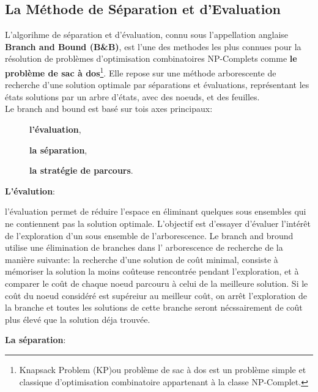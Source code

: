 \documentclass[a4paper,11pt,oneside]{report}
\theoremstyle{plain}
\newcommand{\0}{/ \! \! \! 0}
\theoremstyle{plain}
\begin{document}
\subsection{La M\'ethode de S\'eparation et d'Evaluation}
 L'algorihme de s\'eparation et d'\'evaluation, connu sous l'appellation anglaise {\bf Branch and Bound (B\&B)}, est l'une des methodes les plus
 connues pour la r\'esolution de probl\`emes d'optimisation combinatoires NP-Complets comme {\bf le probl\`eme de sac \`a dos}\footnote{Knapsack Problem 
  (KP)ou probl\`eme de sac \`a dos est un probl\`eme simple et classique d'optimisation combinatoire appartenant \`a la classe NP-Complet.}.
 Elle repose sur une m\'ethode arborescente de recherche d'une solution optimale par s\'eparations et \'evaluations, repr\'esentant les \'etats 
 solutions par un arbre d'\'etats, avec des noeuds, et des feuilles.\\
  Le branch and bound est bas\'e sur tois axes principaux:
  \begin{description}
   \item[] {\bf l'\'evaluation},
   \item[] {\bf la s\'eparation},
   \item[] {\bf la strat\'egie de parcours}.
  \end{description}
  {\bf L'\'evalution}:
  \begin{description}
  \item l'\'evaluation permet de r\'eduire l'espace en \'eliminant quelques sous ensembles qui ne contiennent pas la solution optimale. L'objectif est d'essayer
   d'\'evaluer l'int\'er\^et de l'exploration d'un sous ensemble de l'arborescence. Le branch and bround utilise une \'elimination de branches dans l'
   arborescence de recherche de la mani\`ere suivante: la recherche d'une solution de co\^ut minimal, consiste \`a m\'emoriser la solution la moins
   co\^uteuse rencontr\'ee pendant l'exploration, et \`a comparer le co\^ut de chaque noeud parcouru \`a celui de la meilleure solution. Si le co\^ut du
   noeud consid\'er\'e est sup\'ereiur au meilleur co\^ut, on arr\^et l'exploration de la branche et toutes les solutions de cette branche seront 
   n\'ecssairement de co\^ut plus \'elev\'e que la solution d\'eja trouv\'ee. 
  \end{description}
  {\bf La s\'eparation}:
\end{document}
